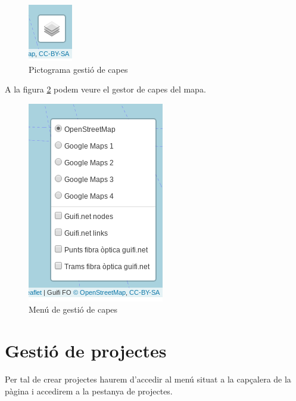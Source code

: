 \documentclass[a4paper]{article}
\begin{document}
	\begin{figure}[H]
		\centering
		\includegraphics{images/pictogram_layer.png}
		\caption{Pictograma gestió de capes}
		\label{fig:pictogram-layer}
	\end{figure}

	A la figura \ref{fig:layer-manager} podem veure el gestor de capes del mapa.
	\begin{figure}[H]
		\centering
		\includegraphics{images/layer_manager.png}
		\caption{Menú de gestió de capes}
		\label{fig:layer-manager}
	\end{figure}
	
	\section{Gestió de projectes}
	Per tal de crear projectes haurem d'accedir al menú situat a la capçalera de la pàgina i accedirem a la pestanya de projectes.
	
\end{document}
